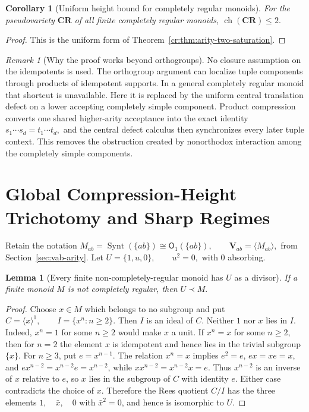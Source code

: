 \documentclass[10pt,a4paper]{article}
\newtheorem{lemma}[theorem]{Lemma}
\newtheorem{corollary}[theorem]{Corollary}
\theoremstyle{definition}
\theoremstyle{remark}
\newtheorem{remark}[theorem]{Remark}
\newcommand{\Obj}{\mathsf O}
\begin{document}
\begin{corollary}[Uniform height bound for completely regular monoids]
\label{cr:cor:height-upper}
For the pseudovariety \(\mathbf{CR}\) of all finite completely regular monoids,
\(\operatorname{ch}(\mathbf{CR})\le 2.\)
\end{corollary}

\begin{proof}
This is the uniform form of
Theorem~\ref{cr:thm:arity-two-saturation}.
\end{proof}

\begin{remark}[Why the proof works beyond orthogroups]
No closure assumption on the idempotents is used. The orthogroup argument
can localize tuple components through products of idempotent supports. In a
general completely regular monoid that shortcut is unavailable. Here it is
replaced by the uniform central translation defect on a lower accepting
completely simple component. Product compression converts one shared
higher-arity acceptance into the exact identity
\(s_1\cdots s_d=t_1\cdots t_d,\)
and the central defect calculus then synchronizes every later tuple context.
This removes the obstruction created by nonorthodox interaction among the
completely simple components.
\end{remark}



\section{Global Compression-Height Trichotomy and Sharp Regimes}
\label{sec:global-arity-trichotomy}

Retain the notation
\(
 M_{ab}=\operatorname{Synt}(\{ab\})\cong\Obj_1(\{ab\}),
 \qquad \mathbf V_{ab}=\langle M_{ab}\rangle,
\)
from Section~\ref{sec:vab-arity}. Let \(U=\{1,u,0\},\qquad u^2=0,\) with \(0\) absorbing.

\begin{lemma}[Every finite non-completely-regular monoid has \(U\) as a divisor]
\label{global:lem:U-divisor}
If a finite monoid \(M\) is not completely regular, then \(U\prec M.\) \end{lemma}

\begin{proof}
Choose \(x\in M\) which belongs to no subgroup and put \(C=\langle x\rangle^1,\qquad I=\{x^n:n\ge2\}.\) Then \(I\) is an ideal of \(C\). Neither \(1\) nor \(x\) lies in \(I\).
Indeed, \(x^n=1\) for some \(n\ge2\) would make \(x\) a unit. If
\(x^n=x\) for some \(n\ge2\), then for \(n=2\) the element \(x\) is
idempotent and hence lies in the trivial subgroup \(\{x\}\).  For
\(n\ge3\), put \(e=x^{n-1}\).  The relation \(x^n=x\) implies
\(e^2=e\), \(ex=xe=x\), and
\(e x^{n-2}=x^{n-2}e=x^{n-2}\), while
\(x x^{n-2}=x^{n-2}x=e\).  Thus \(x^{n-2}\) is an inverse of \(x\)
relative to \(e\), so \(x\) lies in the subgroup of \(C\) with
identity \(e\). Either case contradicts the choice of \(x\). Therefore the Rees quotient \(C/I\) has the three elements \(1,\quad\bar x,\quad0\) with \(\bar x^2=0\), and hence is isomorphic to \(U\).
\end{proof}
\end{document}
